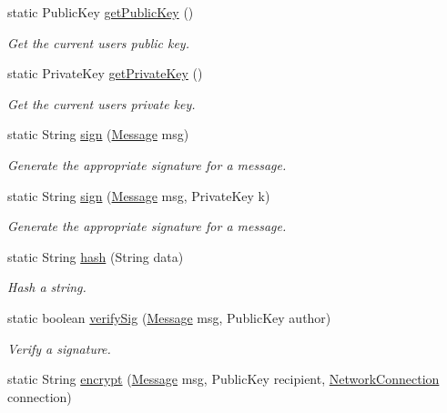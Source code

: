 \begin{DoxyCompactItemize}
static Public\-Key \hyperlink{classballmerpeak_1_1turtlenet_1_1server_1_1Crypto_a830f62b5e45e6d1f424c3340b80d90c2}{get\-Public\-Key} ()
\begin{DoxyCompactList}\small\item\em Get the current users public key. \end{DoxyCompactList}\item 
static Private\-Key \hyperlink{classballmerpeak_1_1turtlenet_1_1server_1_1Crypto_af6bfe6ea68cff3020c22221361f2d7f2}{get\-Private\-Key} ()
\begin{DoxyCompactList}\small\item\em Get the current users private key. \end{DoxyCompactList}\item 
static String \hyperlink{classballmerpeak_1_1turtlenet_1_1server_1_1Crypto_a3551509d86a909950bb4c44ae1803240}{sign} (\hyperlink{classballmerpeak_1_1turtlenet_1_1shared_1_1Message}{Message} msg)
\begin{DoxyCompactList}\small\item\em Generate the appropriate signature for a message. \end{DoxyCompactList}\item 
static String \hyperlink{classballmerpeak_1_1turtlenet_1_1server_1_1Crypto_aaa857c040134654c8d6187cb4f4090b5}{sign} (\hyperlink{classballmerpeak_1_1turtlenet_1_1shared_1_1Message}{Message} msg, Private\-Key k)
\begin{DoxyCompactList}\small\item\em Generate the appropriate signature for a message. \end{DoxyCompactList}\item 
static String \hyperlink{classballmerpeak_1_1turtlenet_1_1server_1_1Crypto_a359e1b82e7bf6ff8018bed7829850def}{hash} (String data)
\begin{DoxyCompactList}\small\item\em Hash a string. \end{DoxyCompactList}\item 
static boolean \hyperlink{classballmerpeak_1_1turtlenet_1_1server_1_1Crypto_ae5bdc4040fce3773ce9d5718d3bf8d0b}{verify\-Sig} (\hyperlink{classballmerpeak_1_1turtlenet_1_1shared_1_1Message}{Message} msg, Public\-Key author)
\begin{DoxyCompactList}\small\item\em Verify a signature. \end{DoxyCompactList}\item 
static String \hyperlink{classballmerpeak_1_1turtlenet_1_1server_1_1Crypto_ae3b4ea7217b7e91abd1d42f932611c85}{encrypt} (\hyperlink{classballmerpeak_1_1turtlenet_1_1shared_1_1Message}{Message} msg, Public\-Key recipient, \hyperlink{classballmerpeak_1_1turtlenet_1_1server_1_1NetworkConnection}{Network\-Connection} connection)

\end{DoxyCompactItemize}
